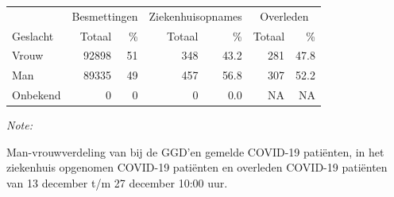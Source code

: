 \documentclass[
  english,
  man,floatsintext]{apa6}
\begin{document}
\begin{table}
\centering\begingroup\fontsize{11}{13}\selectfont

\begin{threeparttable}
\begin{tabular}{lrrrrrr}
\toprule
\multicolumn{1}{c}{ } & \multicolumn{2}{c}{Besmettingen} & \multicolumn{2}{c}{Ziekenhuisopnames} & \multicolumn{2}{c}{Overleden} \\
\cmidrule(l{3pt}r{3pt}){2-3} \cmidrule(l{3pt}r{3pt}){4-5} \cmidrule(l{3pt}r{3pt}){6-7}
Geslacht & Totaal & \% & Totaal & \% & Totaal & \%\\
\midrule
Vrouw & 92898 & 51 & 348 & 43.2 & 281 & 47.8\\
Man & 89335 & 49 & 457 & 56.8 & 307 & 52.2\\
Onbekend & 0 & 0 & 0 & 0.0 & NA & NA\\
\bottomrule
\end{tabular}
\begin{tablenotes}
\item \textit{Note: } 
\item Man-vrouwverdeling van bij de GGD’en gemelde COVID-19 patiënten, in het ziekenhuis opgenomen COVID-19 patiënten en overleden COVID-19 patiënten van 13 december t/m 27 december 10:00 uur.
\end{tablenotes}
\end{threeparttable}
\endgroup{}
\end{table}
\newpage
\end{document}
